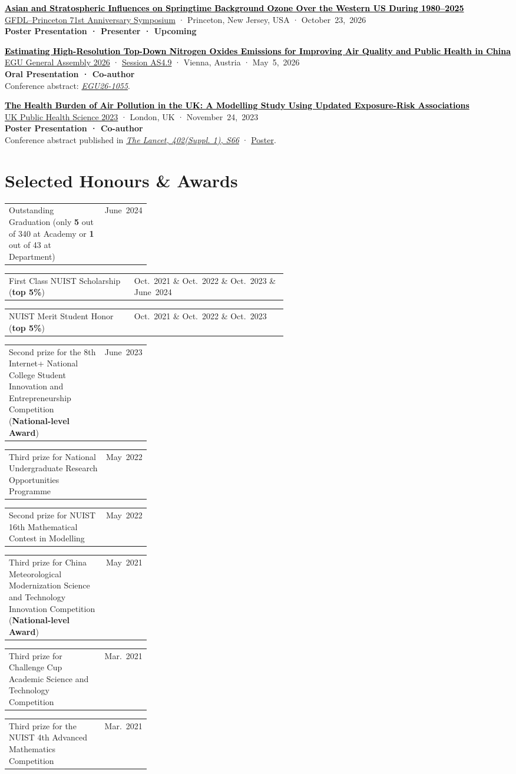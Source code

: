 \documentclass[11pt,a4paper]{article}
\makeatletter
\newcommand{\datedentry}[3][0.28]{%
  \noindent
  \begin{tabularx}{\linewidth}{@{}>{\raggedright\arraybackslash}X >{\raggedleft\arraybackslash}p{#1\linewidth}@{}}
    #2 & #3
  \end{tabularx}\par
}
\newcommand{\publication}[1]{%
  \Needspace{4\baselineskip}
  \par\noindent #1\par
}
\makeatother
\begin{document}
\publication{\href{https://www.gfdl.noaa.gov/gfdl-princeton-71st-anniversary-symposium/}{\textcolor{black}{\textbf{Asian and Stratospheric Influences on Springtime Background Ozone Over the Western US During \mbox{1980--2025}}}}\\
  \href{https://www.gfdl.noaa.gov/gfdl-princeton-71st-anniversary-symposium/}{GFDL--Princeton 71st Anniversary Symposium} · Princeton, New Jersey, USA · October~23,~2026\\
  \textbf{Poster Presentation · Presenter · Upcoming}}

\publication{\href{https://meetingorganizer.copernicus.org/EGU26/EGU26-1055.html}{\textcolor{black}{\textbf{Estimating High-Resolution Top-Down Nitrogen Oxides Emissions for Improving Air Quality and Public Health in China}}}\\
  \href{https://www.egu26.eu/}{EGU General Assembly 2026} · \href{https://www.egu26.eu/session/56474}{Session AS4.9} · Vienna, Austria · May~5,~2026\\
  \textbf{Oral Presentation · Co-author}\\
  Conference abstract: \href{https://doi.org/10.5194/egusphere-egu26-1055}{\textit{EGU26-1055}}.}

\publication{\href{https://doi.org/10.1016/S0140-6736(23)02099-8}{\textcolor{black}{\textbf{The Health Burden of Air Pollution in the UK: A Modelling Study Using Updated Exposure-Risk Associations}}}\\
  \href{https://ukpublichealthscience.org/?p=463}{UK Public Health Science 2023} · London, UK · November~24,~2023\\
  \textbf{Poster Presentation · Co-author}\\
  Conference abstract published in \href{https://doi.org/10.1016/S0140-6736(23)02099-8}{\textit{The Lancet, 402(Suppl. 1), S66}} · \href{https://maraisresearchgroup.co.uk/Presentations/Vohra-TheLancet-2023.pdf}{Poster}.}

\section*{Selected Honours \& Awards}

\datedentry{Outstanding Graduation (only \textbf{5} out of 340 at Academy or \textbf{1} out of 43 at Department)}{June~2024}
\datedentry[0.55]{First Class NUIST Scholarship (\textbf{top 5\%})}{Oct.~2021 \& Oct.~2022 \& Oct.~2023 \& June~2024}
\datedentry[0.55]{NUIST Merit Student Honor (\textbf{top 5\%})}{Oct.~2021 \& Oct.~2022 \& Oct.~2023}
\datedentry{Second prize for the 8th Internet+ National College Student Innovation and Entrepreneurship Competition (\textbf{National-level Award})}{June~2023}
\datedentry{Third prize for National Undergraduate Research Opportunities Programme}{May~2022}
\datedentry{Second prize for NUIST 16th Mathematical Contest in Modelling}{May~2022}
\datedentry{Third prize for China Meteorological Modernization Science and Technology Innovation Competition (\textbf{National-level Award})}{May~2021}
\datedentry{Third prize for Challenge Cup Academic Science and Technology Competition}{Mar.~2021}
\datedentry{Third prize for the NUIST 4th Advanced Mathematics Competition}{Mar.~2021}
\end{document}
